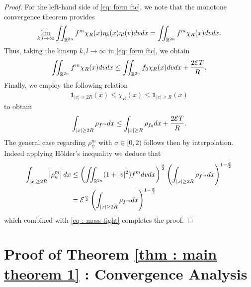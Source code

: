 \documentclass{amsart}
\theoremstyle{plain}
\theoremstyle{remark}
\numberwithin{equation}{section}
\newcommand{\calE}{\mathcal E}
\newcommand{\R}{\mathbb{R}}
\newcommand{\dx}{\textnormal{d}x}
\newcommand{\dv}{\textnormal{d}v}
\newcommand{\lt}{\left}
\newcommand{\rt}{\right}
\begin{document}
\begin{proof}
For the left-hand side of \eqref{eq: form ftc}, we note that the monotone convergence theorem provides
\[
\lim_{k,l \to \infty} \iint_{\R^{2n}} f^m \chi_R(x)\eta_k(x)\eta_l(v)\dv\dx = \iint_{\R^{2n}} f^m \chi_R(x) \dv\dx.
\]
Thus, taking the limsup $k,l \to \infty$ in \eqref{eq: form ftc}, we obtain
\[
\iint_{\R^{2n}} f^m \chi_R(x) \dv\dx \le \iint_{\R^{2n}} f_0 \chi_R(x)\dv\dx + \frac{2\calE T}{R}.
\]
Finally, we employ the following relation
\begin{align*}
        \mathbf{1}_{|x|\ge 2R }(x) \le \chi_R(x) \le \mathbf{1}_{|x|\ge R} (x)
\end{align*}
to obtain
\begin{equation}\label{eq : mass tight}
\begin{split}
    \int_{|x|\ge 2R} \rho_{f^m} \dx \le \int_{|x|\ge R} \rho_{f_0}\dx + \frac{2\calE T}{R}.
    \end{split}
\end{equation}
The general case regarding $\rho_{\psi}^m$ with $\sigma \in [0,2)$ follows then by interpolation. Indeed applying H\"older's inequality we deduce that 
\begin{align*}
\int_{|x|\ge 2R} \left|\rho_{\psi}^{m} \right| \dx 
&\le  \lt(\iint_{\R^{2n}} (1+|v|^2) f^m \dv\dx\rt)^{\frac{\sigma}{2}} \lt(\int_{|x|\ge 2R} \rho_{f^{m}} \dx\rt)^{1- \frac{\sigma}{2}}  \\
&= \mathcal{E}^{\frac{\sigma}{2}} \lt(\int_{|x|\ge 2R} \rho_{f^{m}} \dx\rt)^{1- \frac{\sigma}{2}} 
\end{align*}
which combined with \eqref{eq : mass tight} completes the proof.
\end{proof}




\section{Proof of Theorem \ref{thm : main theorem 1} : Convergence Analysis} \label{sec:pss}
\end{document}
